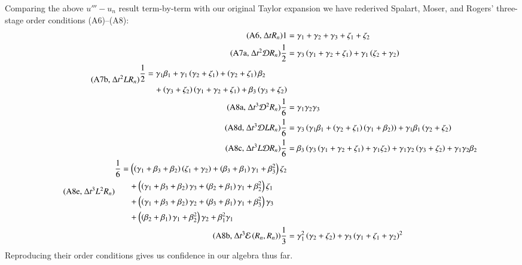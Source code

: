 \documentclass[letterpaper,11pt]{amsart}
\begin{document}
Comparing the above $u''' - u_{n}$ result term-by-term with our original Taylor
expansion we have rederived Spalart, Moser, and Rogers' three-stage order
conditions (A6)--(A8):
\begin{align*}
\tag{A6, $\Delta{}t R_{n}$}
1
&=
\gamma_{1} + \gamma_{2} + \gamma_{3} + \zeta_{1} + \zeta_{2}
\\
\tag{A7a, $\Delta{}t^{2} \mathcal{D} R_{n}$}
\frac{1}{2}
&=
\gamma_{3} \left(
  \gamma_{1} + \gamma_{2} + \zeta_{1}
\right)
+
\gamma_{1} \left(
  \zeta_{2} + \gamma_{2}
\right)
\\
\tag{A7b, $\Delta{}t^{2} L R_{n}$}
\begin{split}
\frac{1}{2}
&=
\gamma_{1} \beta_{1}
+
\gamma_{1} \left( \gamma_{2} + \zeta_{1} \right)
+
\left( \gamma_{2} + \zeta_{1} \right) \beta_{2}
\\
&\quad{}+
\left( \gamma_{3} + \zeta_{2} \right)\left(
  \gamma_{1} + \gamma_{2} + \zeta_{1}
\right)
+
\beta_{3} \left( \gamma_{3} + \zeta_{2} \right)
\end{split}
\\
\tag{A8a, $\Delta{}t^{3} \mathcal{D}^{2} R_{n}$}
\frac{1}{6}
&=
\gamma_{1} \gamma_{2} \gamma_{3}
\\
\tag{A8d, $\Delta{}t^{3} \mathcal{D} L R_{n}$}
\frac{1}{6}
&=
\gamma_{3} \left(
  \gamma_{1} \beta_{1}
  +
  \left( \gamma_{2} + \zeta_{1}\right) \left( \gamma_{1} + \beta_{2} \right)
\right)
+
\gamma_{1} \beta_{1} \left(
  \gamma_{2} + \zeta_{2}
\right)
\\
\tag{A8c, $\Delta{}t^{3} L \mathcal{D} R_{n}$}
\frac{1}{6}
&=
\beta_{3} \left(
  \gamma_{3} \left( \gamma_{1} + \gamma_{2} + \zeta_{1} \right)
  +
  \gamma_{1} \zeta_{2}
\right)
+
\gamma_{1} \gamma_{2} \left( \gamma_{3} + \zeta_{2} \right)
+
\gamma_{1} \gamma_{2} \beta_{2}
\\
\tag{A8e, $\Delta{}t^{3} L^{2} R_{n}$}
\begin{split}
\frac{1}{6}
&=
\left(
  \left( \gamma_{1} + \beta_{3} + \beta_{2} \right)
  \left( \zeta_{1} + \gamma_{2} \right)
  +
  \left( \beta_{3} + \beta_{1} \right) \gamma_{1}
  +
  \beta_{3}^{2}
\right) \zeta_{2}
\\
&\quad{}+
\left(
  \left( \gamma_{1} + \beta_{3} + \beta_{2} \right) \gamma_{3}
  +
  \left( \beta_{2} + \beta_{1} \right) \gamma_{1}
  +
  \beta_{2}^{2}
\right) \zeta_{1}
\\
&\quad{}+
\left(
  \left( \gamma_{1} + \beta_{3} + \beta_{2} \right) \gamma_{2}
  +
  \left( \beta_{3} + \beta_{1} \right) \gamma_{1}
  +
  \beta_{3}^{2}
\right) \gamma_{3}
\\
&\quad{}+
\left(
  \left( \beta_{2} + \beta_{1} \right) \gamma_{1}
  +
  \beta_{2}^{2}
\right) \gamma_{2}
+
\beta_{1}^{2} \gamma_{1}
\end{split}
\\
\tag{A8b, $\Delta{}t^{3} \mathcal{E}\left( R_{n}, R_{n} \right)$}
\frac{1}{3}
&=
\gamma_{1}^{2} \left( \gamma_{2} + \zeta_{2} \right)
+
\gamma_{3} \left( \gamma_{1} + \zeta_{1} + \gamma_{2} \right)^{2}
\end{align*}
Reproducing their order conditions gives us confidence in our algebra thus far.
\end{document}
